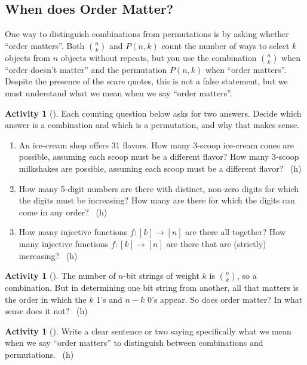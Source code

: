 \documentclass[10pt,]{book}
\theoremstyle{plain}
\theoremstyle{definition}
\theoremstyle{definition}
\theoremstyle{definition}
\newtheorem{activity}[project]{Activity}
\numberwithin{equation}{chapter}
\begin{document}
\subsection[{When does Order Matter?}]{When does Order Matter?}\label{subsec-ordermatters}
\hypertarget{p-788}{}%
One way to distinguish combinations from permutations is by asking whether ``order matters''.  Both \(\binom{n}{k}\) and \(P(n,k)\) count the number of ways to select \(k\) objects from \(n\) objects without repeats, but you use the combination \(\binom{n}{k}\) when ``order doesn't matter'' and the permutation \(P(n,k)\) when ``order matters''.  Despite the presence of the scare quotes, this is not a false statement, but we must understand what we mean when we say ``order matters''.%
\begin{activity}[]\label{activity-109}
\hypertarget{p-789}{}%
Each counting question below asks for two answers.  Decide which answer is a combination and which is a permutation, and why that makes sense.%
\begin{enumerate}[font=\bfseries,label=(\alph*),ref=\alph*]
\item\label{task-147} \hypertarget{p-790}{}%
An ice-cream shop offers 31 flavors.  How many 3-scoop ice-cream cones are possible, assuming each scoop must be a different flavor?  How many 3-scoop milkshakes are possible, assuming each scoop must be a different flavor?%
~{\tiny (h)}\item\label{task-148} \hypertarget{p-792}{}%
How many 5-digit numbers are there with distinct, non-zero digits for which the digits must be increasing?  How many are there for which the digits can come in any order?%
~{\tiny (h)}\item\label{task-149} \hypertarget{p-794}{}%
How many injective functions \(f:[k] \to [n]\) are there all   together?  How many injective functions \(f:[k] \to [n]\) are there that are (strictly) increasing?%
~{\tiny (h)}\end{enumerate}
\end{activity}
\begin{activity}[]\label{activity-110}
\hypertarget{p-796}{}%
The number of \(n\)-bit strings of weight \(k\) is \(\binom{n}{k}\), so a combination.  But in determining one bit string from another, all that matters is the order in which the \(k\) 1's and \(n-k\) 0's appear.  So does order matter?  In what sense does it not?%
~{\tiny (h)}\end{activity}
\begin{activity}[]\label{activity-111}
\hypertarget{p-798}{}%
Write a clear sentence or two saying specifically what we mean when we say ``order matters'' to distinguish between combinations and permutations.%
~{\tiny (h)}\end{activity}
\end{document}
